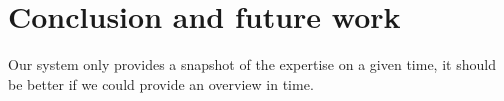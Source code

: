 \chapter{Conclusion and future work}

Our system only provides a snapshot of the expertise on a given time, it should be better if we could provide an overview in time.